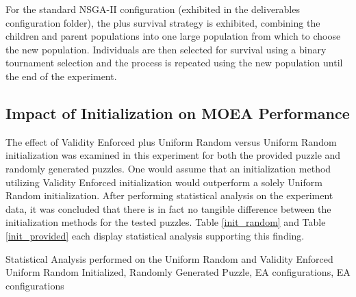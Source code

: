 \documentclass[11pt]{article}
\newcommand{\tablecaption}[1]{\caption{Statistical Analysis performed on the {#1}, EA configurations}}
\begin{document}
For the standard NSGA-II configuration (exhibited in the deliverables configuration folder),
the plus survival strategy is exhibited, combining the children and parent populations into 
one large population from which to choose the new population. Individuals are then selected for 
survival using a binary tournament selection and the process is repeated using the new population
until the end of the experiment.


\subsection{Impact of Initialization on MOEA Performance}

The effect of Validity Enforced plus Uniform Random versus Uniform Random initialization
was examined in this experiment for both the provided puzzle and randomly generated puzzles.
One would assume that an initialization method utilizing Validity
Enforced initialization would outperform a solely Uniform Random initialization. After performing 
statistical analysis on the experiment data, it was concluded that there is in fact no tangible difference
between the initialization methods for the tested puzzles. Table \ref{init_random} and Table \ref{init_provided} 
each display statistical analysis supporting this finding. 

\begin{table}[H]
\tablecaption{Uniform Random and Validity Enforced Uniform Random Initialized, Randomly Generated Puzzle, EA configurations}        
\label{init_random}                 
\end{table}
\end{document}
